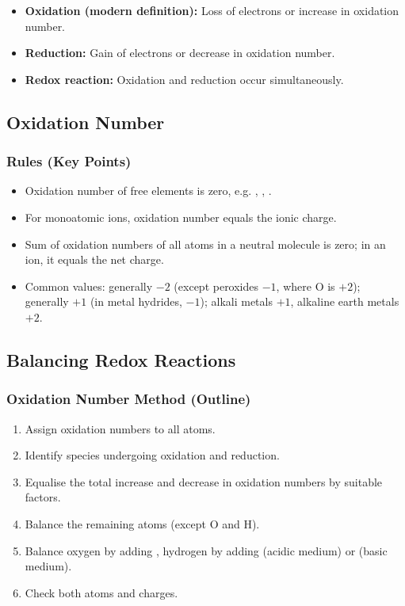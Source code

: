 \documentclass[12pt,a4paper]{article}
\begin{document}
\begin{itemize}
    \item \textbf{Oxidation (modern definition):} Loss of electrons or increase in oxidation number.
    \item \textbf{Reduction:} Gain of electrons or decrease in oxidation number.
    \item \textbf{Redox reaction:} Oxidation and reduction occur simultaneously.
\end{itemize}

\subsection{Oxidation Number}

\subsubsection{Rules (Key Points)}
\begin{itemize}
    \item Oxidation number of free elements is zero, e.g. , , .
    \item For monoatomic ions, oxidation number equals the ionic charge.
    \item Sum of oxidation numbers of all atoms in a neutral molecule is zero; in an ion, it equals the net charge.
    \item Common values:  generally $-2$ (except peroxides $-1$,  where O is $+2$);  generally $+1$ (in metal hydrides, $-1$); alkali metals $+1$, alkaline earth metals $+2$.
\end{itemize}

\subsection{Balancing Redox Reactions}

\subsubsection{Oxidation Number Method (Outline)}
\begin{enumerate}
    \item Assign oxidation numbers to all atoms.
    \item Identify species undergoing oxidation and reduction.
    \item Equalise the total increase and decrease in oxidation numbers by suitable factors.
    \item Balance the remaining atoms (except O and H).
    \item Balance oxygen by adding , hydrogen by adding  (acidic medium) or  (basic medium).
    \item Check both atoms and charges.
\end{enumerate}
\end{document}
